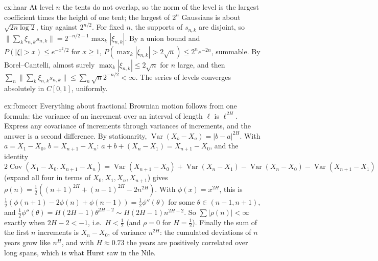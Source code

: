 \begin{solution}{ex:haar}
\idea At level $n$ the tents do not overlap, so the norm of the level is the largest coefficient times the height of one tent; the largest of $2^n$ Gaussians is about $\sqrt{2n\log2}$, tiny against $2^{n/2}$.
\writeup For fixed $n$, the supports of $s_{n,k}$ are disjoint, so $\|\sum_k\xi_{n,k}s_{n,k}\|=2^{-n/2-1}\max_k|\xi_{n,k}|$. By a union bound and $P(|\xi|>x)\le e^{-x^2/2}$ for $x\ge1$,
$P(\max_k|\xi_{n,k}|>2\sqrt n)\le2^ne^{-2n}$, summable. By Borel--Cantelli, almost surely $\max_k|\xi_{n,k}|\le2\sqrt n$ for $n$ large, and then $\sum_n\|\sum_k\xi_{n,k}s_{n,k}\|\le\sum_n\sqrt n2^{-n/2}<\infty$. The series of levels
converges absolutely in $C[0,1]$, uniformly.
\end{solution}

\begin{solution}{ex:fbmcorr}
\idea Everything about fractional Brownian motion follows from one formula: the variance of an increment over an interval of length $\ell$ is $\ell^{2H}$. Express any covariance of increments through variances of
increments, and the answer is a second difference.
\writeup By stationarity, $\operatorname{Var}(X_b-X_a)=|b-a|^{2H}$. With $a=X_1-X_0$, $b=X_{n+1}-X_n$: $a+b+(X_n-X_1)=X_{n+1}-X_0$, and the identity
$2\operatorname{Cov}(X_1-X_0,X_{n+1}-X_n)=\operatorname{Var}(X_{n+1}-X_0)+\operatorname{Var}(X_n-X_1)-\operatorname{Var}(X_{n}-X_0)-\operatorname{Var}(X_{n+1}-X_1)$ (expand all four in terms of $X_0,X_1,X_n,X_{n+1}$)
gives $\rho(n)=\frac12((n+1)^{2H}+(n-1)^{2H}-2n^{2H})$. With $\phi(x)=x^{2H}$, this is $\frac12(\phi(n+1)-2\phi(n)+\phi(n-1))=\frac12\phi''(\theta)$ for some $\theta\in(n-1,n+1)$, and
$\frac12\phi''(\theta)=H(2H-1)\theta^{2H-2}\sim H(2H-1)n^{2H-2}$. So $\sum|\rho(n)|<\infty$ exactly when $2H-2<-1$, i.e.\ $H<\frac12$ (and $\rho=0$ for $H=\frac12$). Finally the sum of the first $n$ increments is $X_n-X_0$,
of variance $n^{2H}$: the cumulated deviations of $n$ years grow like $n^H$, and with $H\approx0.73$ the years are positively correlated over long spans, which is what Hurst saw in the Nile.
\end{solution}

